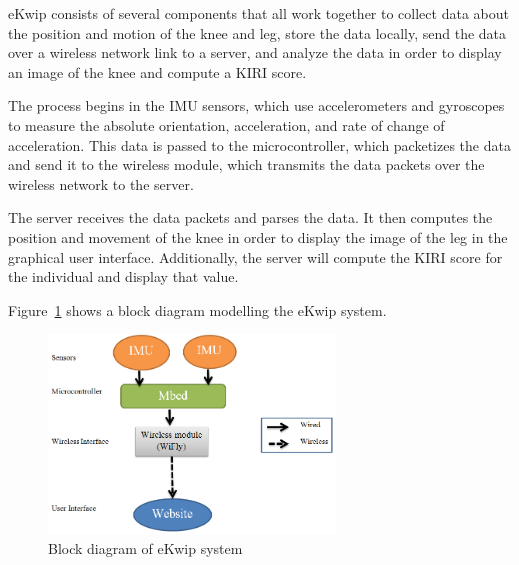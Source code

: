 eKwip consists of several components that all work together to collect data about the position and motion of the knee and leg, store the data locally, send the data over a wireless network link to a server, and analyze the data in order to display an image of the knee and compute a KIRI score.

The process begins in the IMU sensors, which use accelerometers and gyroscopes to measure the absolute orientation, acceleration, and rate of change of acceleration. This data is passed to the microcontroller, which packetizes the data and send it to the wireless module, which transmits the data packets over the wireless network to the server.

The server receives the data packets and parses the data. It then computes the position and movement of the knee in order to display the image of the leg in the graphical user interface. Additionally, the server will compute the KIRI score for the individual and display that value.

Figure~\ref{fig:block_diagram} shows a block diagram modelling the eKwip system.

\begin{figure}[h]
  \begin{center}
    \includegraphics[width=3in]{images/block_diagram.PNG}
  \end{center}
  \caption{Block diagram of eKwip system}
  \label{fig:block_diagram}
\end{figure}